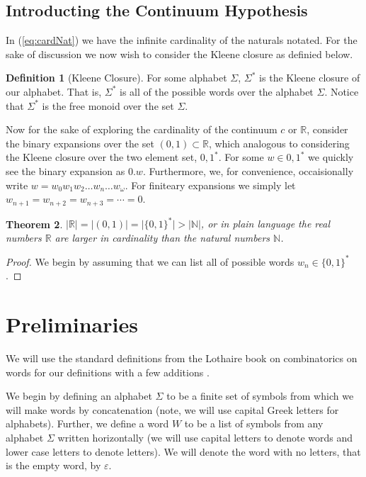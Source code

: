 \documentclass[12pt]{amsart}
\newtheorem{thm}{Theorem}[section]
\theoremstyle{definition}
\newtheorem{defn}[thm]{Definition}
\theoremstyle{plain}
\theoremstyle{nameit}
\theoremstyle{plain}
\begin{document}
\begin{onehalfspace}
\subsection{Introducting the Continuum Hypothesis}
In (\ref{eq:cardNat}) we have the infinite cardinality of the naturals notated. For the sake of discussion we now wish
to consider the Kleene closure as definied below.
\begin{defn}[Kleene Closure]
For some alphabet $\Sigma$, $\Sigma^*$ is the Kleene closure of our alphabet. That is, $\Sigma^*$ is all
of the possible words over the alphabet $\Sigma$. Notice that $\Sigma^*$ is the free monoid over the set
$\Sigma$.
\end{defn}

Now for the sake of exploring the cardinality of the continuum $c$ or $\mathbb{R}$, consider the binary
expansions over the set $(0, 1) \subset \mathbb{R}$, which analogous to considering the Kleene closure
over the two element set, ${0,1}^*$. For some $w\in{0 ,1}^*$ we quickly see the binary expansion as $0.w$.
Furthermore, we, for convenience, occaisionally write $w=w_0 w_1 w_2 \ldots w_n \ldots w_\omega$. For finiteary
expansions we simply let $w_{n+1} = w_{n+2} = w_{n+3} = \cdots = 0$.

\begin{thm}
$\vert\mathbb{R}\vert = \vert(0, 1)\vert = \vert\{0,1\}^*\vert > |\mathbb{N}|$, or in plain language the real numbers
$\mathbb{R}$ are larger in cardinality than the natural numbers $\mathbb{N}$.
\end{thm}

\begin{proof}
We begin by assuming that we can list all of possible words $w_n \in \{0, 1 \}^*$.
\end{proof}

\section{Preliminaries}

We will use the standard definitions from the Lothaire book on combinatorics on words for our definitions
with a few additions \cite{lothaire}.

We begin by defining an alphabet $\Sigma$ to be a finite set of symbols from which we will make words
by concatenation (note, we will use capital Greek letters for alphabets). Further, we define a word $W$ to
be a list of symbols from any alphabet $\Sigma$ written horizontally (we will use capital letters to denote
words and lower case letters to denote letters). We will denote the word with no letters, that is the empty
word, by $\varepsilon$.


\end{onehalfspace}
\end{document}
